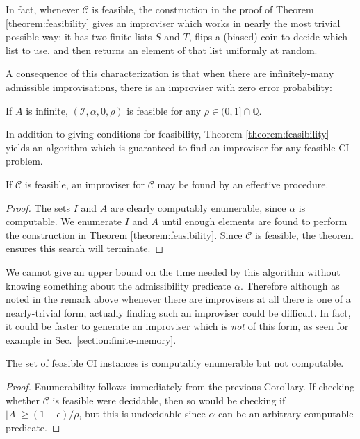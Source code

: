 \documentclass[a4paper,USenglish,numberwithinsect]{lipics}
\theoremstyle{plain}
\theoremstyle{definition}
\newcommand{\Q}{\mathbb{Q}}
\newcommand{\improvs}{I}
\newcommand{\valids}{A}
\begin{document}
\begin{remark}
In fact, whenever $\mathcal{C}$ is feasible, the construction in the proof of Theorem \ref{theorem:feasibility} gives an improviser which works in nearly the most trivial possible way: it has two finite lists $S$ and $T$, flips a (biased) coin to decide which list to use, and then returns an element of that list uniformly at random.
\end{remark}

A consequence of this characterization is that when there are infinitely-many admissible improvisations, there is an improviser with zero error probability:

\begin{corollary}
If $\valids$ is infinite, $(\mathcal{\improvs}, \alpha, 0, \rho)$ is feasible for any $\rho \in (0,1] \cap \Q$.
\end{corollary}

In addition to giving conditions for feasibility, Theorem \ref{theorem:feasibility} yields an algorithm which is guaranteed to find an improviser for any feasible CI problem.

\begin{corollary}
If $\mathcal{C}$ is feasible, an improviser for $\mathcal{C}$ may be found by an effective procedure.
\end{corollary}
\begin{proof}
The sets $\improvs$ and $\valids$ are clearly computably enumerable, since $\alpha$ is computable. We enumerate $\improvs$ and $\valids$ until enough elements are found to perform the construction in Theorem \ref{theorem:feasibility}. Since $\mathcal{C}$ is feasible, the theorem ensures this search will terminate.
\end{proof}

We cannot give an upper bound on the time needed by this algorithm without knowing something about the admissibility predicate $\alpha$. Therefore although as noted in the remark above whenever there are improvisers at all there is one of a nearly-trivial form, actually finding such an improviser could be difficult. In fact, it could be faster to generate an improviser which is \emph{not} of this form, as seen for example in Sec.~\ref{section:finite-memory}.

\begin{corollary}
The set of feasible CI instances is computably enumerable but not computable.
\end{corollary}
\begin{proof}
Enumerability follows immediately from the previous Corollary. If checking whether $\mathcal{C}$ is feasible were decidable, then so would be checking if $|\valids| \ge (1-\epsilon)/\rho$, but this is undecidable since $\alpha$ can be an arbitrary computable predicate.
\end{proof}
\end{document}
